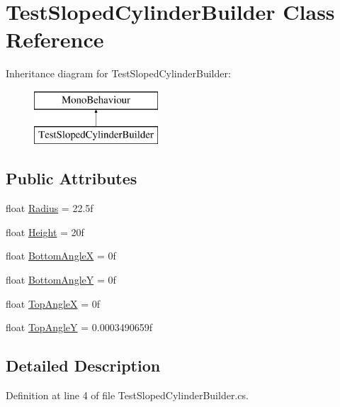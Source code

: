 \hypertarget{class_test_sloped_cylinder_builder}{}\section{Test\+Sloped\+Cylinder\+Builder Class Reference}
\label{class_test_sloped_cylinder_builder}
Inheritance diagram for Test\+Sloped\+Cylinder\+Builder\+:\begin{figure}[H]
\begin{center}
\leavevmode
\includegraphics[height=2.000000cm]{class_test_sloped_cylinder_builder}
\end{center}
\end{figure}
\subsection*{Public Attributes}
\begin{DoxyCompactItemize}
\item 
float \mbox{\hyperlink{class_test_sloped_cylinder_builder_abc7566777cbdcc1083686c92aa344481}{Radius}} = 22.\+5f
\item 
float \mbox{\hyperlink{class_test_sloped_cylinder_builder_a53324557fa6ca70df36741b6ed463b5f}{Height}} = 20f
\item 
float \mbox{\hyperlink{class_test_sloped_cylinder_builder_a24e6665f03622ec76c8a79448dba73fc}{Bottom\+AngleX}} = 0f
\item 
float \mbox{\hyperlink{class_test_sloped_cylinder_builder_a4b3e3a73eee9404924361f1b39d3ea12}{Bottom\+AngleY}} = 0f
\item 
float \mbox{\hyperlink{class_test_sloped_cylinder_builder_a6ed38c9d30e8bdaea84784b67fbf3d97}{Top\+AngleX}} = 0f
\item 
float \mbox{\hyperlink{class_test_sloped_cylinder_builder_aae0ad5f365a7d0308bf73b470a1de593}{Top\+AngleY}} = 0.\+0003490659f
\end{DoxyCompactItemize}


\subsection{Detailed Description}


Definition at line 4 of file Test\+Sloped\+Cylinder\+Builder.\+cs.



